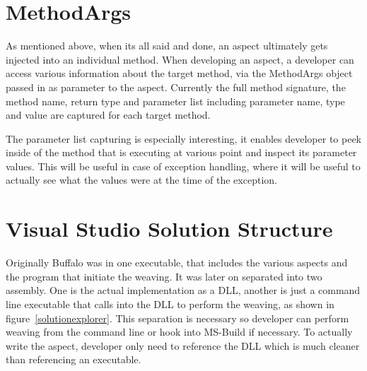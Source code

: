 \section{MethodArgs}

As mentioned above, when its all said and done, an aspect ultimately gets injected into an individual method. When developing an aspect, a developer can access various information about the target method, via the MethodArgs object passed in as parameter to the aspect. Currently the full method signature, the method name, return type and parameter list including parameter name, type and value are captured for each target method.

The parameter list capturing is especially interesting, it enables developer to peek inside of the method that is executing at various point and inspect its parameter values. This will be useful in case of exception handling, where it will be useful to actually see what the values were at the time of the exception.

\section{Visual Studio Solution Structure}

Originally Buffalo was in one executable, that includes the various aspects and the program that initiate the weaving. It was later on separated into two assembly. One is the actual implementation as a DLL, another is just a command line executable that calls into the DLL to perform the weaving, as shown in figure~\ref{solutionexplorer}. This separation is necessary so developer can perform weaving from the command line or hook into MS-Build if necessary. To actually write the aspect, developer only need to reference the DLL which is much cleaner than referencing an executable.

